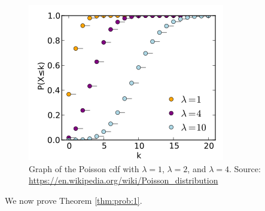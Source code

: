 \begin{figure}[h]
\caption{\label{fig:1} Graph of the Poisson cdf with $\lambda=1$, $\lambda=2$, and $\lambda=4$. Source: \url{https://en.wikipedia.org/wiki/Poisson_distribution}}
\centering
\includegraphics[width=0.4\linewidth]{figures/Poisson_cdf.png}
\end{figure}



We now prove Theorem \ref{thm:prob:1}.


